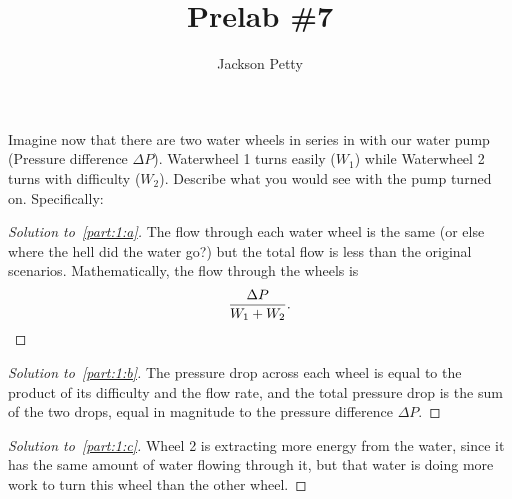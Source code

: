 \documentclass[10pt, physics]{homework}
\title{Prelab \#7}
\author{Jackson Petty}
\begin{document}
	\begin{problem}
		Imagine now that there are two water wheels in series in with our water pump (Pressure difference $\Delta P$). Waterwheel 1 turns easily ($W_1$) while Waterwheel 2 turns with difficulty ($W_2$). Describe what you would see with the pump turned on. Specifically:
	\end{problem}
	\begin{proof}[Solution to~\ref{part:1:a}]
		The flow through each water wheel is the same (or else where the hell did the water go?) but the total flow is less than the original scenarios. Mathematically, the flow through the wheels is 
		\[ \frac{\Delta P}{W_1 + W_2}.\qedhere \]
	\end{proof}
	\begin{proof}[Solution to~\ref{part:1:b}]
		The pressure drop across each wheel is equal to the product of its difficulty and the flow rate, and the total pressure drop is the sum of the two drops, equal in magnitude to the pressure difference $\Delta P$.
	\end{proof}
	\begin{proof}[Solution to~\ref{part:1:c}]
		Wheel 2 is extracting more energy from the water, since it has the same amount of water flowing through it, but that water is doing more work to turn this wheel than the other wheel.
	\end{proof}
\end{document}
